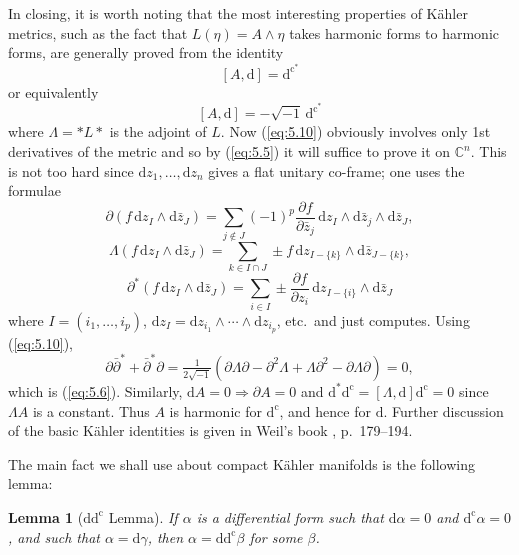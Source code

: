\documentclass[11pt]{amsart}
\theoremstyle{plain}
\newtheorem{lemma}[theorem]{Lemma}
\theoremstyle{definition}
\newcommand{\dd}{\mathrm{d}}
\newcommand{\dc}{\mathrm{d}^{\mathrm{c}}}
\newcommand{\CC}{\mathbb{C}}
\begin{document}
In closing, it is worth noting that the most interesting properties of K\"ahler metrics, such as the fact that $L(\eta) = A \wedge \eta$ takes harmonic forms to harmonic forms, are generally proved from the identity
\begin{equation}\label{eq:5.9}
[A, \dd] = \dc^{*}
\end{equation}
or equivalently
\begin{equation}\label{eq:5.10}
[A, \dd] = -\sqrt{-1}\, \dc^{*}
\end{equation}
where $\Lambda = *L*$ is the adjoint of $L$. Now (\ref{eq:5.10}) obviously involves only 1st derivatives of the metric and so by (\ref{eq:5.5}) it will suffice to prove it on $\CC^{n}$. This is not too hard since $\dd z_{1}, \ldots, \dd z_{n}$ gives a flat unitary co-frame; one uses the formulae
\[
\partial(f\, \dd z_{I} \wedge \dd\bar{z}_{J}) = \sum_{j \notin J} (-1)^{p} \frac{\partial f}{\partial\bar{z}_{j}}\, \dd z_{I} \wedge \dd\bar{z}_{j} \wedge \dd\bar{z}_{J},
\]
\[
\Lambda(f\, \dd z_{I} \wedge \dd\bar{z}_{J}) = \sum_{k \in I \cap J} \pm f\, \dd z_{I - \{k\}} \wedge \dd\bar{z}_{J - \{k\}},
\]
\[
\partial^{*}(f\, \dd z_{I} \wedge \dd\bar{z}_{J}) = \sum_{i \in I} \pm \frac{\partial f}{\partial z_{i}}\, \dd z_{I - \{i\}} \wedge \dd\bar{z}_{J}
\]
where $I = (i_{1}, \ldots, i_{p})$, $\dd z_{I} = \dd z_{i_{1}} \wedge \cdots \wedge \dd z_{i_{p}}$, etc.\ and just computes. Using (\ref{eq:5.10}),
\[
\partial\bar{\partial}^{*} + \bar{\partial}^{*}\partial = \tfrac{1}{2\sqrt{-1}}(\partial\Lambda\partial - \partial^{2}\Lambda + \Lambda\partial^{2} - \partial\Lambda\partial) = 0,
\]
which is (\ref{eq:5.6}). Similarly, $\dd A = 0 \Rightarrow \partial A = 0$ and $\dd^{*}\dc = [\Lambda, \dd]\dc = 0$ since $\Lambda A$ is a constant. Thus $A$ is harmonic for $\dc$, and hence for $\dd$. Further discussion of the basic K\"ahler identities is given in Weil's book \cite{W}, p.~179--194.

The main fact we shall use about compact K\"ahler manifolds is the following lemma:

\begin{lemma}[$\dd\dc$ Lemma]\label{lem:5.11}
If $\alpha$ is a differential form such that $\dd\alpha = 0$ and $\dc\alpha = 0$, and such that $\alpha = \dd\gamma$, then $\alpha = \dd\dc\beta$ for some $\beta$.
\end{lemma}
\end{document}
